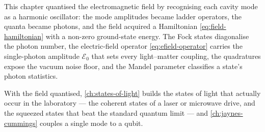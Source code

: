 This chapter quantised the electromagnetic field by recognising
each cavity mode as a harmonic oscillator: the mode amplitudes
became ladder operators, the quanta became photons, and the field
acquired a Hamiltonian \cref{eq:field-hamiltonian} with a non-zero
ground-state energy. The Fock states diagonalise the photon number,
the electric-field operator \cref{eq:efield-operator} carries the
single-photon amplitude $\mathcal E_0$ that sets every light--matter
coupling, the quadratures expose the vacuum noise floor, and the
Mandel parameter classifies a state's photon statistics.

With the field quantised, \cref{ch:states-of-light} builds the
states of light that actually occur in the laboratory --- the
coherent states of a laser or microwave drive, and the squeezed
states that beat the standard quantum limit --- and
\cref{ch:jaynes-cummings} couples a single mode to a qubit.

